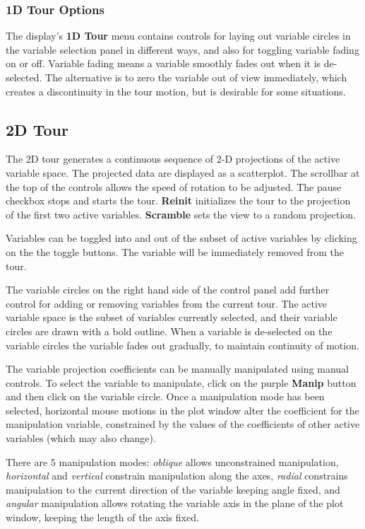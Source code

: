 \documentclass[11pt]{article}
\def\Widget#1{\textbf{#1}}
\begin{document}
\subsubsection{1D Tour Options}

The display's \Widget{1D Tour} menu contains controls for laying out
variable circles in the variable selection panel in different ways,
and also for toggling variable fading on or off. Variable fading means
a variable smoothly fades out when it is de-selected. The alternative
is to zero the variable out of view immediately, which creates a
discontinuity in the tour motion, but is desirable for some
situations.

\subsection{2D Tour}
\label{slbl:2DTour}

The 2D tour generates a continuous sequence of 2-D projections of the
active variable space. The projected data are displayed as a
scatterplot. The scrollbar at the top of the controls allows the speed
of rotation to be adjusted. The pause checkbox stops and starts the
tour. \Widget{Reinit} initializes the tour to the projection of the
first two active variables. \Widget{Scramble} sets the view to a
random projection.

Variables can be toggled into and out of the subset of active
variables by clicking on the the toggle buttons. The variable will be
immediately removed from the tour. 

The variable circles on the right hand side of the control panel add
further control for adding or removing variables from the current
tour. The active variable space is the subset of variables currently
selected, and their variable circles are drawn with a bold
outline. When a variable is de-selected on the variable circles the
variable fades out gradually, to maintain continuity of motion.

The variable projection coefficients can be manually manipulated using
manual controls. To select the variable to manipulate, click on the
purple \Widget{Manip} button and then click on the variable circle.
Once a manipulation mode has been selected, horizontal mouse motions
in the plot window alter the coefficient for the manipulation
variable, constrained by the values of the coefficients of other
active variables (which may also change).

There are 5 manipulation modes: {\it oblique} allows unconstrained
manipulation, {\it horizontal} and {\it vertical} constrain manipulation
along the axes, {\it radial} constrains manipulation to the current
direction of the variable keeping angle fixed, and {\it angular}
manipulation allows rotating the variable axis in the plane of the plot
window, keeping the length of the axis fixed.
\end{document}
